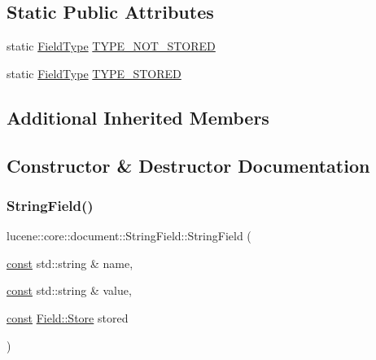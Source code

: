 \subsection*{Static Public Attributes}
\begin{DoxyCompactItemize}
\item 
static \mbox{\hyperlink{classlucene_1_1core_1_1document_1_1FieldType}{Field\+Type}} \mbox{\hyperlink{classlucene_1_1core_1_1document_1_1StringField_a098fa2afb00e417e8b811cf8ef410eb7}{T\+Y\+P\+E\+\_\+\+N\+O\+T\+\_\+\+S\+T\+O\+R\+ED}}
\item 
static \mbox{\hyperlink{classlucene_1_1core_1_1document_1_1FieldType}{Field\+Type}} \mbox{\hyperlink{classlucene_1_1core_1_1document_1_1StringField_aca1223a0a169a61b12b1168d35e4c5e7}{T\+Y\+P\+E\+\_\+\+S\+T\+O\+R\+ED}}
\end{DoxyCompactItemize}
\subsection*{Additional Inherited Members}


\subsection{Constructor \& Destructor Documentation}
\mbox{\label{classlucene_1_1core_1_1document_1_1StringField_af114024658947018095142ba97f04658}} 
\subsubsection{\texorpdfstring{String\+Field()}{StringField()}\hspace{0.1cm}{\footnotesize\ttfamily [1/4]}}
{\footnotesize\ttfamily lucene\+::core\+::document\+::\+String\+Field\+::\+String\+Field (\begin{DoxyParamCaption}\item[{\mbox{\hyperlink{ZlibCrc32_8h_a2c212835823e3c54a8ab6d95c652660e}{const}} std\+::string \&}]{name,  }\item[{\mbox{\hyperlink{ZlibCrc32_8h_a2c212835823e3c54a8ab6d95c652660e}{const}} std\+::string \&}]{value,  }\item[{\mbox{\hyperlink{ZlibCrc32_8h_a2c212835823e3c54a8ab6d95c652660e}{const}} \mbox{\hyperlink{classlucene_1_1core_1_1document_1_1Field_a7d5d79f0c56d3548ab8d46d0e7dae35d}{Field\+::\+Store}}}]{stored }\end{DoxyParamCaption})\hspace{0.3cm}{\ttfamily [inline]}}

